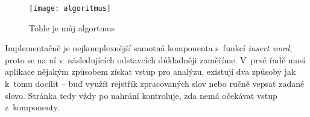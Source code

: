 \begin{figure}[ht]   
    \centering
    \texttt{[image: algoritmus]}  
    \caption{Tohle je můj algortmus}
    \label{algoritmus}
 \end{figure}

Implementačně je nejkomplexnější samotná komponenta s~funkcí
\emph{insert word}, proto se na ní v~následujících odstavcích důkladněji
zaměříme. V~prvé řadě musí aplikace nějakým způsobem získat vstup pro
analýzu, existují dva způsoby jak k~tomu docílit -- buď využít rejstřík
zpracovaných slov nebo ručně vepsat zadané slovo. Stránka tedy vždy po
nahrání kontroluje, zda nemá očekávat vstup z~komponenty.

